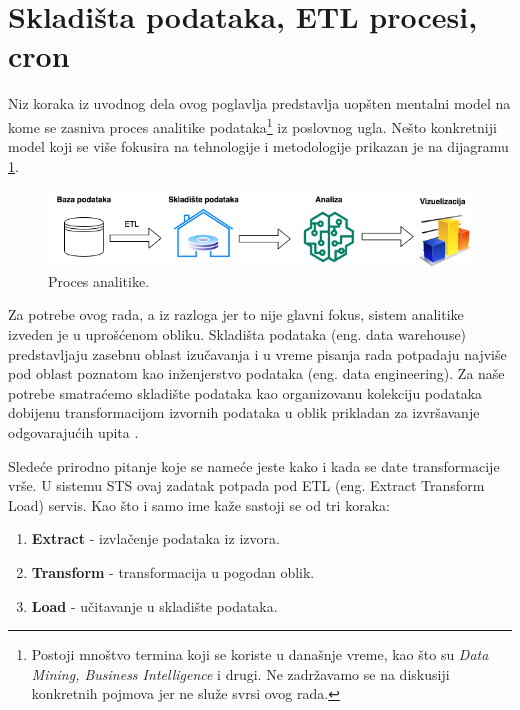 \documentclass[12pt,oneside]{memoir}
\begin{document}
\section{Skladišta podataka, ETL procesi, cron}

Niz koraka iz uvodnog dela ovog poglavlja predstavlja uopšten mentalni model na kome se zasniva proces analitike podataka\footnote{Postoji mnoštvo termina koji se koriste u današnje vreme, kao što su \textit{Data Mining, Business Intelligence} i drugi. Ne zadržavamo se na diskusiji konkretnih pojmova jer ne služe svrsi ovog rada.} iz poslovnog ugla. Nešto konkretniji model koji se više fokusira na tehnologije i metodologije prikazan je na dijagramu \ref{fig:datadiag}.

\begin{figure}[h]
  \centering
  \includegraphics[width=1\textwidth]{docs/images/ch_5/datadiag.png} 
  \caption{Proces analitike.}
  \label{fig:datadiag}
\end{figure}

Za potrebe ovog rada, a iz razloga jer to nije glavni fokus, sistem analitike izveden je u uprošćenom obliku. Skladišta podataka (eng. data warehouse) predstavljaju zasebnu oblast izučavanja i u vreme pisanja rada potpadaju najviše pod oblast poznatom kao inženjerstvo podataka (eng. data engineering). Za naše potrebe smatraćemo skladište podataka kao organizovanu kolekciju podataka dobijenu transformacijom izvornih podataka u oblik prikladan za izvršavanje odgovarajućih upita \cite{dataanalytics}.

Sledeće prirodno pitanje koje se nameće jeste kako i kada se date transformacije vrše. U sistemu STS ovaj zadatak potpada pod ETL (eng. Extract Transform Load) servis. Kao što i samo ime kaže sastoji se od tri koraka:
\begin{enumerate}
    \item \textbf{Extract} - izvlačenje podataka iz izvora.
    \item \textbf{Transform} - transformacija u pogodan oblik.
    \item \textbf{Load} - učitavanje u skladište podataka.
\end{enumerate}
\end{document}
